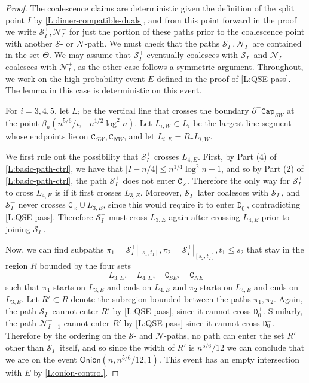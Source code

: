 \documentclass[11pt,twoside]{amsart}
\theoremstyle{plain}
\numberwithin{quest}{section}
\theoremstyle{remark}
\numberwithin{rem}{section}
\theoremstyle{definition}
\newcommand{\cS}{\mathcal{S}}
\newcommand{\cN}{\mathcal{N}}
\renewcommand{\tt}[1]{{\mathtt{#1}}}
\begin{document}
	\begin{proof}
		The coalescence claims are deterministic given the definition of the split point $I$ by \cref{L:dimer-compatible-duals}, and from this point forward in the proof we write $\cS_I^+, \cN_I^-$ for just the portion of these paths prior to the coalescence point with another $\cS$- or $\cN$-path. We must check that the paths $\cS_I^+, \cN_I^-$ are contained in the set $\Theta$. We may assume that $\cS_I^+$ eventually coalesces with $\cS_I^-$ and $\cN_I^-$ coalesces with $\cN_I^+$, as the other case follows a symmetric argument. Throughout, we work on the high probability event $E$ defined in the proof of \cref{L:QSE-pass}. The lemma in this case is deterministic on this event.
		
		For $i = 3, 4, 5$, let $L_i$ be the vertical line that crosses the boundary $\partial^-\tt{Cap}_{SW}$ at the point $\beta_n(n^{5/6}/i, -n^{1/2}\log^2 n)$. Let $L_{i, W} \subset L_i$ be the largest line segment whose endpoints lie on $\tt{C}_{SW}, \tt{C}_{NW}$, and let $L_{i, E} = R_\pi L_{i, W}$. 
		
		We first rule out the possibility that $\cS_I^+$ crosses $L_{4, E}$. First, by Part (4) of \cref{L:basic-path-ctrl}, we have that $|I - n/4| \le n^{1/4} \log^2 n + 1$, and so by Part (2) of \cref{L:basic-path-ctrl}, the path $\cS_I^+$ does not enter $\tt{C}_\times$. Therefore the only way for $\cS_I^+$ to cross $L_{4, E}$ is if it first crosses $L_{3, E}$. Moreover,  $\cS_I^+$ later coalesces with $\cS_I^-$, and $\cS_I^-$ never crosses $\tt{C}_\times \cup L_{3, E}$, since this would require it to enter $\tt{D}_0^+$, contradicting \cref{L:QSE-pass}. Therefore $\cS_I^+$ must cross $L_{3, E}$ again after crossing $L_{4, E}$ prior to joining $\cS_I^-$.
		
		
		Now, we can find subpaths $\pi_1 = \cS_I^+|_{[s_1, t_1]}, \pi_2 = \cS_I^+|_{[s_2, t_2]}, t_1 \le s_2$ that stay in the region $R$ bounded by the four sets
		$$
		L_{3, E}, \quad L_{4, E}, \quad \tt{C}_{SE}, \quad \tt{C}_{NE}
		$$
		such that $\pi_1$ starts on $L_{3, E}$ and ends on $L_{4, E}$ and $\pi_2$ starts on $L_{4, E}$ and ends on $L_{3, E}$. Let $R' \subset R$ denote the subregion bounded between the paths $\pi_1, \pi_2$. Again, the path $\cS_I^-$ cannot enter $R'$ by \cref{L:QSE-pass}, since it cannot cross $\tt{D}_0^+$. Similarly, the path $\cN_{I+1}^+$ cannot enter $R'$ by \cref{L:QSE-pass} since it cannot cross $\tt{D}_0^-$. Therefore by the ordering on the $\cS$- and $\cN$-paths, no path can enter the set $R'$ other than $\cS_I^+$ itself, and so since the width of $R'$ is $n^{5/6}/12$ we can conclude that we are on the event $\mathsf{Onion}(n, n^{5/6}/12, 1)$. This event has an empty intersection with $E$ by \cref{L:onion-control}.
		

\end{proof}
\end{document}
